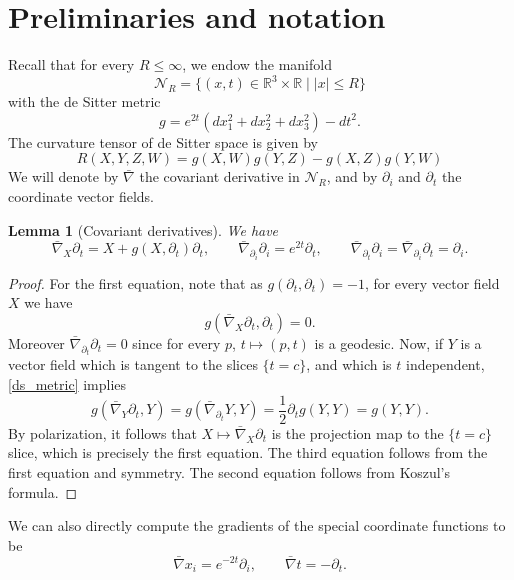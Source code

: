 \documentclass[leqno,11pt]{amsart}
\newtheorem{lemma}[theorem]{Lemma}
\theoremstyle{definition}
\newcommand{\p}{\partial}
\begin{document}
\section{Preliminaries and notation}
Recall that for every $R\leq \infty$, we endow the manifold
\begin{equation}
\mathcal{N}_R=\{(x,t)\in \mathbb{R}^3\times \mathbb{R}\;|\; |x| \leq R \}
\end{equation}
with the de Sitter metric 
\begin{equation}\label{ds_metric}
g=e^{2t}(dx_1^2+dx_2^2+dx_3^2)-dt^2.
\end{equation}
The curvature tensor of de Sitter space is given by
\begin{equation}\label{ds_curvature}
R(X,Y,Z,W)=g(X,W)g(Y,Z)-g(X,Z)g(Y,W)
\end{equation}
We will denote by $\bar{\nabla}$ the covariant derivative in $\mathcal{N}_R$, and by $\p_{i}$ and $\p_t$ the coordinate vector fields.
\begin{lemma}[Covariant derivatives]
We have
\begin{equation}\label{nabla_t_eq}
\bar{\nabla}_X \partial_t= X+g(X,\p_t)\p_t, \qquad \bar{\nabla}_{\partial_i}\partial_i=e^{2t}\partial_t,\qquad \bar{\nabla}_{\partial_t}\partial_i=\bar{\nabla}_{\partial_i}\partial_t=\partial_{i}.
\end{equation}
\end{lemma}
\begin{proof}
For the first equation, note that as $g(\partial_t,\partial_t)=-1$, for every vector field $X$ we have 
\[
g(\bar{\nabla}_X\partial_t,\partial_t)=0.
\]
Moreover $\bar{\nabla}_{\p_t}\p_t=0$ since for every $p$, $t\mapsto(p,t)$ is a geodesic.  Now, if $Y$ is a vector field which is tangent to the slices $\{t=c\}$, and which is $t$ independent, \eqref{ds_metric} implies
\begin{equation}
g(\bar{\nabla}_Y\p_t,Y)=g(\bar{\nabla}_{\p_t}Y,Y)=\frac{1}{2}\partial_t g(Y,Y)=g(Y,Y).
\end{equation}
By polarization, it follows that $X\mapsto \bar{\nabla}_X\partial_t$ is the projection map to the $\{t=c\}$ slice, which is precisely the first equation. The third equation follows from the first equation and symmetry. The second equation follows from Koszul's formula.
\end{proof}
We can also directly compute { the gradients of the special coordinate functions to be}
\begin{equation}\label{cor_grads}
\bar{\nabla} x_i=e^{-2t}\partial_i, \qquad \bar{\nabla} t=-\partial_t.
\end{equation}
\end{document}
